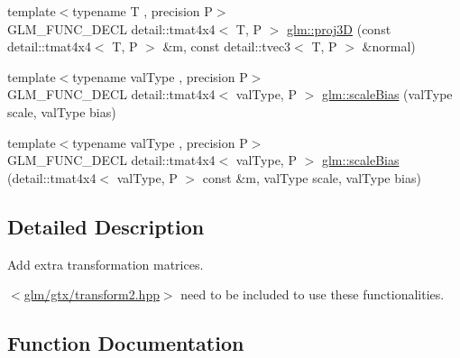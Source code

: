 \begin{DoxyCompactItemize}
\item 
{\footnotesize template$<$typename T , precision P$>$ }\\G\+L\+M\+\_\+\+F\+U\+N\+C\+\_\+\+D\+E\+CL detail\+::tmat4x4$<$ T, P $>$ \hyperlink{group__gtx__transform2_ga70a21b940727b94060fd3826eeacb048}{glm\+::proj3D} (const detail\+::tmat4x4$<$ T, P $>$ \&m, const detail\+::tvec3$<$ T, P $>$ \&normal)
\item 
{\footnotesize template$<$typename val\+Type , precision P$>$ }\\G\+L\+M\+\_\+\+F\+U\+N\+C\+\_\+\+D\+E\+CL detail\+::tmat4x4$<$ val\+Type, P $>$ \hyperlink{group__gtx__transform2_ga0a387ae1a7fd1a2ca451ac47833ee3e2}{glm\+::scale\+Bias} (val\+Type scale, val\+Type bias)
\item 
{\footnotesize template$<$typename val\+Type , precision P$>$ }\\G\+L\+M\+\_\+\+F\+U\+N\+C\+\_\+\+D\+E\+CL detail\+::tmat4x4$<$ val\+Type, P $>$ \hyperlink{group__gtx__transform2_gae733630f90c53ca3dce8daf50f25d6ab}{glm\+::scale\+Bias} (detail\+::tmat4x4$<$ val\+Type, P $>$ const \&m, val\+Type scale, val\+Type bias)
\end{DoxyCompactItemize}


\subsection{Detailed Description}
Add extra transformation matrices. 

$<$\hyperlink{transform2_8hpp}{glm/gtx/transform2.\+hpp}$>$ need to be included to use these functionalities. 

\subsection{Function Documentation}
